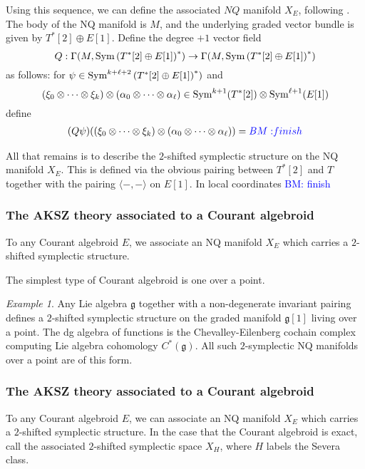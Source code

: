 \documentclass{article}
\def\fg{\mathfrak{g}}
\theoremstyle{definition}
\theoremstyle{remark}
\newtheorem{Ex}[theorem]{Example}
\def\brian{\textcolor{blue}{BM: }\textcolor{blue}}
\begin{document}
Using this sequence, we can define the associated $NQ$ manifold $X_E$, following \cite{Ryotenberg:2002nu}.
The body of the NQ manifold is $M$, and the underlying graded vector bundle is given by $T^*[2] \oplus E[1]$. 
Define the degree $+1$ vector field 
\[
Q : \Gamma(M , {\rm Sym} \left(T^*[2] \oplus E[1]\right)^*) \to \Gamma(M , {\rm Sym} \left(T^*[2] \oplus E[1]\right)^*) 
\]
as follows: for $\psi \in {\rm Sym}^{k + \ell + 2} \left(T^*[2] \oplus E[1]\right)^*)$ and
\[
(\xi_0 \otimes \cdots \otimes \xi_k) \otimes (\alpha_0 \otimes \cdots \otimes \alpha_\ell) \in {\rm Sym}^{k+1}(T^*[2]) \otimes {\rm Sym}^{\ell + 1}(E[1]) 
\]
define
\begin{align*}
(Q \psi) ((\xi_0 \otimes \cdots \otimes \xi_k) \otimes (\alpha_0 \otimes \cdots \otimes \alpha_\ell)) = \brian{finish}
\end{align*}

All that remains is to describe the $2$-shifted symplectic structure on the NQ manifold $X_E$. 
This is defined via the obvious pairing between $T^*[2]$ and $T$ together with the pairing $\langle - ,- \rangle$ on $E[1]$.
In local coordinates \brian{finish}


\subsubsection{The AKSZ theory associated to a Courant algebroid}

To any Courant algebroid $E$, we associate an NQ manifold $X_E$ which carries a $2$-shifted symplectic structure. 

The simplest type of Courant algebroid is one over a point.

\begin{Ex}\label{ex: cs}
Any Lie algebra $\fg$ together with a non-degenerate invariant pairing defines a $2$-shifted symplectic structure on the graded manifold $\fg[1]$ living over a point. 
The dg algebra of functions is the Chevalley-Eilenberg cochain complex computing Lie algebra cohomology $C^*(\fg)$. 
All such $2$-symplectic NQ manifolds over a point are of this form. 
\end{Ex}

\subsubsection{The AKSZ theory associated to a Courant algebroid}

To any Courant algebroid $E$, we can associate an NQ manifold $X_E$ which carries a $2$-shifted symplectic structure.
In the case that the Courant algebroid is exact, call the associated $2$-shifted symplectic space $X_H$, where $H$ labels the Severa class. 
\end{document}
